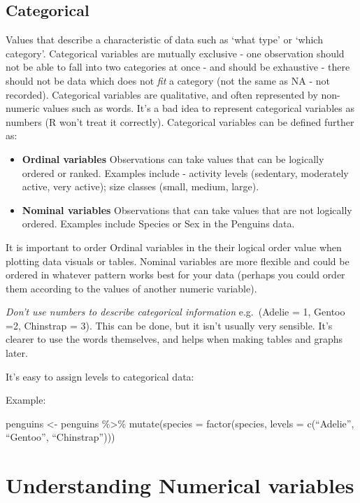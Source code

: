 \documentclass[
]{book}
\makeatletter
\newenvironment{kframe}{%
\medskip{}
\setlength{\fboxsep}{.8em}
 \def\at@end@of@kframe{}%
 \ifinner\ifhmode%
  \def\at@end@of@kframe{\end{minipage}}%
  \begin{minipage}{\columnwidth}%
 \fi\fi%
 \def\FrameCommand##1{\hskip\@totalleftmargin \hskip-\fboxsep
 \colorbox{shadecolor}{##1}\hskip-\fboxsep
     \hskip-\linewidth \hskip-\@totalleftmargin \hskip\columnwidth}%
 \MakeFramed {\advance\hsize-\width
   \@totalleftmargin\z@ \linewidth\hsize
   \@setminipage}}%
 {\par\unskip\endMakeFramed%
 \at@end@of@kframe}
\newenvironment{block}[1]
  {
  \begin{itemize}
  \renewcommand{\labelitemi}{
    \raisebox{-.7\height}[0pt][0pt]{
      {\setkeys{Gin}{width=3em,keepaspectratio}\texttt{[image: images/\#1]}}
    }
  }
  \setlength{\fboxsep}{1em}
  \begin{kframe}
  \item
  }
  {
  \end{kframe}
  \end{itemize}
  }
\newenvironment{rmdwarning}
  {\begin{block}{warning}}
  {\end{block}}
\makeatother
\begin{document}
\hypertarget{categorical}{%
\subsection{Categorical}\label{categorical}}

Values that describe a characteristic of data such as `what type' or `which category'. Categorical variables are mutually exclusive - one observation should not be able to fall into two categories at once - and should be exhaustive - there should not be data which does not \emph{fit} a category (not the same as NA - not recorded). Categorical variables are qualitative, and often represented by non-numeric values such as words. It's a bad idea to represent categorical variables as numbers (R won't treat it correctly). Categorical variables can be defined further as:

\begin{itemize}
\item
  \textbf{Ordinal variables} Observations can take values that can be logically ordered or ranked. Examples include - activity levels (sedentary, moderately active, very active); size classes (small, medium, large).
\item
  \textbf{Nominal variables} Observations that can take values that are not logically ordered. Examples include Species or Sex in the Penguins data.
\end{itemize}

It is important to order Ordinal variables in the their logical order value when plotting data visuals or tables. Nominal variables are more flexible and could be ordered in whatever pattern works best for your data (perhaps you could order them according to the values of another numeric variable).

\begin{rmdwarning}
\emph{Don't use numbers to describe categorical information}
e.g.~(Adelie = 1, Gentoo =2, Chinstrap = 3). This can be done, but it
isn't usually very sensible. It's clearer to use the words themselves,
and helps when making tables and graphs later.

It's easy to assign levels to categorical data:

Example:

penguins \textless- penguins \%\textgreater\% mutate(species =
factor(species, levels = c(``Adelie'', ``Gentoo'', ``Chinstrap'')))
\end{rmdwarning}

\hypertarget{understanding-numerical-variables}{%
\section{Understanding Numerical variables}\label{understanding-numerical-variables}}
\end{document}
